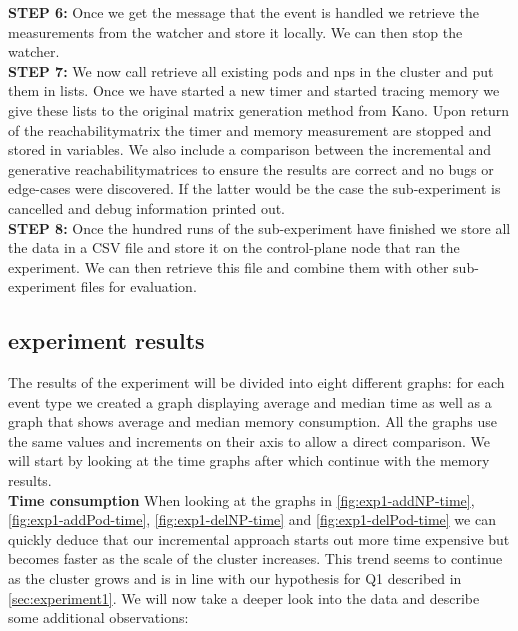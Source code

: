\textbf{STEP 6:} Once we get the message that the event is handled we retrieve the measurements from the watcher and store it locally. We can then stop the watcher.
\\[10pt]

\textbf{STEP 7:} We now call retrieve all existing pods and \acrshort{np}s in the cluster and put them in lists.  Once we have started a new timer and started tracing memory we give these lists to the original matrix generation method from Kano. Upon return of the reachabilitymatrix the timer and memory measurement are stopped and stored in variables. We also include a comparison between the incremental and generative reachabilitymatrices to ensure the results are correct and no bugs or edge-cases were discovered. If the latter would be the case the sub-experiment is cancelled and debug information printed out.
\\[10pt]

\textbf{STEP 8:} Once the hundred runs of the sub-experiment have finished we store all the data in a CSV file and store it on the control-plane node that ran the experiment. We can then retrieve this file and combine them with other sub-experiment files for evaluation. 
\\[10pt]


\subsection{experiment results} \label{exp1:results}

The results of the experiment will be divided into eight different graphs: for each event type we created a graph displaying average and median time as well as a graph that shows average and median memory consumption. All the graphs use the same values and increments on their axis to allow a direct comparison. We will start by looking at the time graphs after which continue with the memory results.
\\[10pt]

\textbf{Time consumption}
\newline When looking at the graphs in \autoref{fig:exp1-addNP-time}, \autoref{fig:exp1-addPod-time}, \autoref{fig:exp1-delNP-time}  and \autoref{fig:exp1-delPod-time} we can quickly deduce that our incremental approach starts out more time expensive but becomes faster as the scale of the cluster increases. This trend seems to continue as the cluster grows and is in line with our hypothesis for Q1 described in \autoref{sec:experiment1}. We will now take a deeper look into the data and describe some additional observations:

